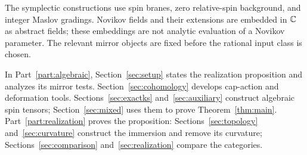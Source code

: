 The symplectic constructions use spin branes, zero relative-spin
background, and integer Maslov gradings.  Novikov fields and their
extensions are embedded in \(\mathbb C\) as abstract fields; these embeddings
are not analytic evaluation of a Novikov parameter.  The relevant
mirror objects are fixed before the rational input class is chosen.

In Part~\ref{part:algebraic}, Section~\ref{sec:setup} states the
realization proposition and analyzes its mirror tests.
Section~\ref{sec:cohomology} develops cap-action and deformation tools.
Sections~\ref{sec:exactks} and~\ref{sec:auxiliary} construct algebraic
spin tensors; Section~\ref{sec:mixed} uses them to prove
Theorem~\ref{thm:main}.  Part~\ref{part:realization} proves the proposition:
Sections~\ref{sec:topology} and~\ref{sec:curvature} construct the
immersion and remove its curvature; Sections~\ref{sec:comparison}
and~\ref{sec:realization} compare the categories.
